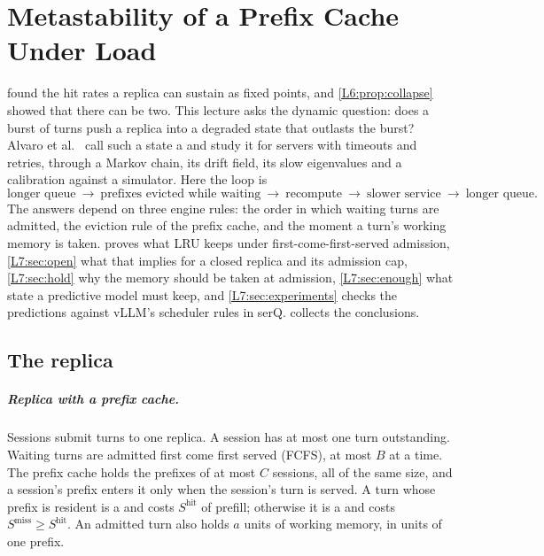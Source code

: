 \chapter{Metastability of a Prefix Cache Under Load}\label{sec:L7}





 found the hit rates a replica can sustain as fixed points, and
\cref{L6:prop:collapse} showed that there can be two. This lecture asks the dynamic
question: does a burst of turns push a replica into a degraded state that outlasts the
burst? Alvaro et al.~\cite{alvaro2025} call such a state a 
and study it for servers with timeouts and retries, through a Markov chain, its drift
field, its slow eigenvalues and a calibration against a simulator. Here the loop is
\[
  \text{longer queue}\ \to\ \text{prefixes evicted while waiting}\ \to\
  \text{recompute}\ \to\ \text{slower service}\ \to\ \text{longer queue}.
\]
The answers depend on three engine rules: the order in which waiting turns are admitted,
the eviction rule of the prefix cache, and the moment a turn's working memory is taken.
\Cref{L7:sec:lru} proves what LRU keeps under first-come-first-served admission,
\cref{L7:sec:open} what that implies for a closed replica and its admission cap,
\cref{L7:sec:hold} why the memory should be taken at admission, \cref{L7:sec:enough} what
state a predictive model must keep, and \cref{L7:sec:experiments} checks the
predictions against vLLM's scheduler rules in serQ. \Cref{L7:sec:conclusions} collects
the conclusions.

\section{The replica}\label{L7:sec:model}

\paragraph{Replica with a prefix cache.}\label{L7:def:replica} Sessions submit turns to one replica. A session has at most one turn outstanding. Waiting
turns are admitted first come first served (FCFS), at most $B$ at a time. The prefix
cache holds the prefixes of at most $C$ sessions, all of the same size, and a session's
prefix enters it only when the session's turn is served. A turn whose prefix is resident
is a \term{hit} and costs $S^{\mathrm{hit}}$ of prefill; otherwise it is a \term{miss}
and costs $S^{\mathrm{miss}}\ge S^{\mathrm{hit}}$. An admitted turn also holds $a$ units
of working memory, in units of one prefix.


